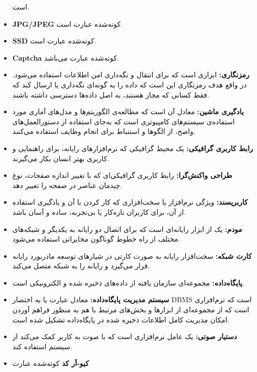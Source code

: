 \documentclass[12pt]{article}
\begin{document}
\begin{itemize}
		  است.
		\item
		\textbf{JPG/JPEG}
		کوته‌شده عبارت
		  است.
		\item
		\textbf{SSD}
		 کوته‌شده‌ عبارت
		  است.
		\item
		\textbf{Captcha}
		کوته‌شده عبارت
	 	 می‌باشد.
		\item
		\textbf{رمزنگاری:}
		ابزاری است که برای انتقال و نگه‌داری امن اطلاعات استفاده می‌شود. در واقع هدف رمزنگاری این است که داده را به گونه‌ای نگه‌داری یا ارسال کند که فقط کسانی که مجاز هستند، به اصل داده‌ها دسترسی داشته باشند.
		\item
		\textbf{یادگیری ماشین:}‌
		 معادل آن
		 است که مطالعه‌ی الگوریتم‌ها و مدل‌های آماری مورد استفاده‌ی سیستم‌های کامپیوتری است که به‌جای استفاده از دستورالعمل‌های واضح، از الگوها و استنباط برای انجام وظایف استفاده می‌کنند.
		\item
		\textbf{رابط کاربری گرافیکی:}
		یک محیط گرافیکی که نرم‌افزارهای رایانه، برای راهنمایی و کاربری بهتر انسان بکار می‌گیرند.
		\item
		\textbf{طراحی واکنش‌گرا:‌}
		رابط کاربری گرافیکی‌ای که با تغییر اندازه صفحات، نوع چیدمان عناصر در صفحه را تغییر دهد.
		\item
		\textbf{کاربر‌پسند:}
		ویژگی نرم‌‏افزار یا سخت‏‌افزاری که کار کردن با آن و یادگیری استفاده از آن، برای کاربران تازه‏‌کار یا بی‌‏تجربه، ساده و آسان باشد.
		\item
		\textbf{مودم:}
		یک از ابزار رایانه‌ای است که برای اتصال دو رایانه به یکدیگر و شبکه‌های مختلف از راه خطوط گوناگون مخابراتی استفاده می‌شود.
		\item
		\textbf{کارت شبکه:‌}
		سخت‌افزار رایانه به صورت کارتی در شیارهای توسعه مادربورد رایانه قرار می‌گیرد و رایانه را به شبکه متصل می‌کند.
		\item
		\textbf{پایگاه‌داده:}
		مجموعه‌ای سازمان یافته از داده‌های ذخیره شده و الکترونیکی است.
		\item
		\textbf{سیستم مدیریت پایگاه‌داده:}
		معادل عبارت
		 یا به اختصار DBMS است که نرم‌افزاری است که از مجموعه‌ای از ابزارها و بخش‌های مرتبط با هم به منظور فراهم آوردن امکان مدیریت کامل اطلاعات ذخیره شده در پایگاه‌داده تشکیل شده است.
		\item
		\textbf{دستیار صوتی:}
		 یک عامل نرم‌افزاری است که با صوت به کاربر کمک می‌کند از سیستم استفاده کند.
		\item
		\textbf{کیو-آر کد}
		 کوته‌شده عبارت

\end{itemize}
\end{document}
